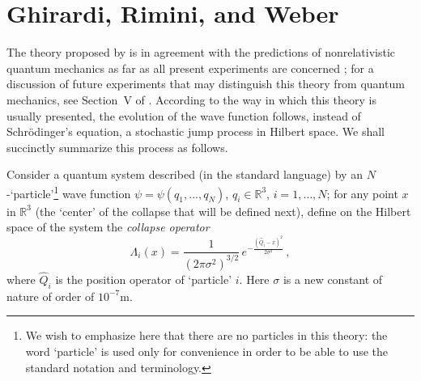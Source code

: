 \documentclass[12pt]{article}
\newcommand{\RRR}{\mathbb{R}}
\begin{document}
\section{Ghirardi, Rimini, and Weber}\label{sec:GRW}


The  theory  proposed by \citet*{GRW86} is in agreement with the predictions of nonrelativistic quantum mechanics as far as 
all present 
experiments are concerned \citep{BG03}; for a discussion of future experiments that may
distinguish this theory from quantum mechanics, see
Section~V of \citep{BG03}. According to the way in which this  theory is usually presented, the evolution of the wave function follows, instead of Schr\"odinger's equation, a stochastic jump process in Hilbert space. 
We shall succinctly summarize this process as follows.

Consider a quantum system described (in the standard language) by 
an $N$-`particle'\footnote{We wish to emphasize here that there are no  particles in this theory: the word `particle' is used only for convenience in order to be able to use the standard notation and terminology.} wave function $\psi = \psi(q_1,...,q_N)$, ${q}_i\in \RRR^3$, $i=1,\dots, N$;  for any point $x$ in $\mathbb{R}^3$ (the `center' of the collapse that will be defined next), define on the Hilbert space of the system  the \emph{collapse operator}
\begin{equation}
\Lambda_i (x) =\frac{1}{(2\pi \sigma^2)^{3/2}}\, e^{-\frac{( \widehat{Q}_i-x)^2}{2\sigma^2}}\,,
\label{eq:collapseoperator}
\end{equation}
where  $\widehat{Q}_i$ is the position operator of  `particle' $i$. Here $\sigma$ is a new constant of nature of order of $10^{-7}$m.
\end{document}

